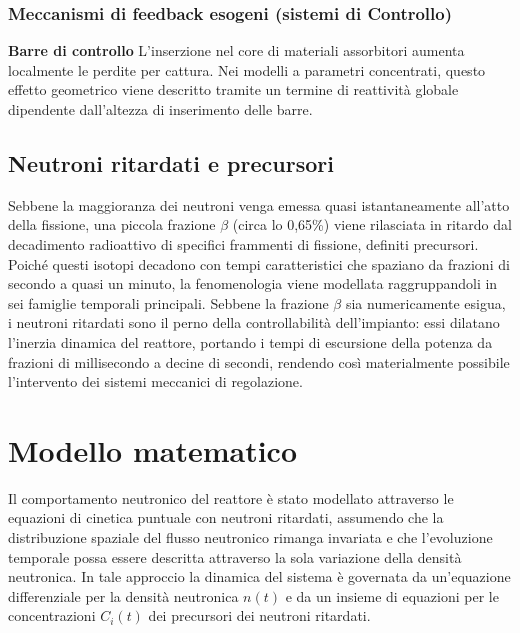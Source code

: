 \documentclass[12pt]{report}
\begin{document}
\subsubsection{\textbf{Meccanismi di feedback esogeni (sistemi di Controllo})}

\textbf{Barre di controllo} L'inserzione nel core di materiali assorbitori aumenta localmente le perdite per cattura. Nei modelli a parametri concentrati, questo effetto geometrico viene descritto tramite un termine di reattività globale dipendente dall'altezza di inserimento delle barre.

\subsection{Neutroni ritardati e precursori}

 Sebbene la maggioranza dei neutroni venga emessa quasi istantaneamente all'atto della fissione, una piccola frazione $\beta$ (circa lo 0,65\%) viene rilasciata in ritardo dal decadimento radioattivo di specifici frammenti di fissione, definiti precursori. Poiché questi isotopi decadono con tempi caratteristici che spaziano da frazioni di secondo a quasi un minuto, la fenomenologia viene modellata raggruppandoli in sei famiglie temporali principali. Sebbene la frazione $\beta$ sia numericamente esigua, i neutroni ritardati sono il perno della controllabilità dell'impianto: essi dilatano l'inerzia dinamica del reattore, portando i tempi di escursione della potenza da frazioni di millisecondo a decine di secondi, rendendo così materialmente possibile l'intervento dei sistemi meccanici di regolazione.

\section{Modello matematico}

Il comportamento neutronico del reattore è stato modellato attraverso le equazioni di cinetica puntuale con neutroni ritardati, assumendo che la distribuzione spaziale del flusso neutronico rimanga invariata e che l’evoluzione temporale possa essere descritta attraverso la sola variazione della densità neutronica. In tale approccio la dinamica del sistema è governata da un’equazione differenziale per la densità neutronica $n(t)$ e da un insieme di equazioni per le concentrazioni $C_i(t)$ dei precursori dei neutroni ritardati.
\end{document}
